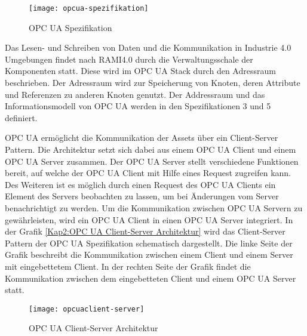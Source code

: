 \begin{figure}[h]
  \centering
  \texttt{[image: opcua-spezifikation]}
  \caption{OPC UA Spezifikation} 
  \label{Grundlagen:OPC UA Spezification}
\end{figure}

Das Lesen- und Schreiben von Daten und die Kommunikation in Industrie 4.0 Umgebungen findet nach \ac{RAMI4.0} durch die Verwaltungsschale der Komponenten statt. Diese wird im \ac{OPC UA} Stack durch den Adressraum beschrieben. Der Adressraum wird zur Speicherung von Knoten, deren Attribute und Referenzen zu anderen Knoten genutzt. Der Addressraum und das Informationsmodell von \ac{OPC UA} werden in den Spezifikationen 3 \cite{opcpt3} und 5 \cite{opcpt5} definiert.

\ac{OPC UA} ermöglicht die Kommunikation der Assets über ein Client-Server Pattern. Die Architektur setzt sich dabei aus einem \ac{OPC UA} Client und einem \ac{OPC UA} Server zusammen. Der \ac{OPC UA} Server stellt verschiedene Funktionen bereit, auf welche der \ac{OPC UA} Client mit Hilfe eines Request zugreifen kann. Des Weiteren ist es möglich durch einen Request des \ac{OPC UA} Clients ein Element des Servers beobachten zu lassen, um bei Änderungen vom Server benachrichtigt zu werden. Um die Kommunikation zwischen \ac{OPC UA} Servern zu gewährleisten, wird ein \ac{OPC UA} Client in einen \ac{OPC UA} Server integriert. In der Grafik \autoref{Kap2:OPC UA Client-Server Architektur} wird das Client-Server Pattern der \ac{OPC UA} Spezifikation schematisch dargestellt. Die linke Seite der Grafik beschreibt die Kommunikation zwischen einem Client und einem Server mit eingebettetem Client. In der rechten Seite der Grafik findet die Kommunikation zwischen dem eingebetteten Client und einem \ac{OPC UA} Server statt.

\begin{figure}[h]
  \centering
  \texttt{[image: opcuaclient-server]}
  \caption{OPC UA Client-Server Architektur}
  \label{Kap2:OPC UA Client-Server Architektur}
\end{figure}

